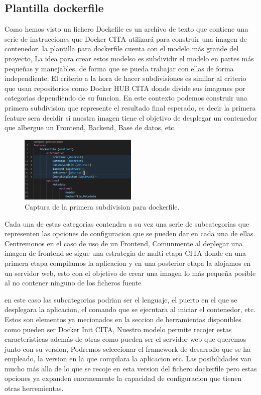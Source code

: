 \documentclass[12pt, a4paper, twoside]{article}
\begin{document}
\subsection{Plantilla dockerfile}
Como hemos visto un fichero Dockefile es un archivo de texto que contiene una serie de instrucciones que Docker CITA utilizará para construir una imagen de contenedor.
la plantilla para dockerfile cuenta con el modelo más grande del proyecto, La idea para crear estos modelso es subdividir el modelo en partes más pequeñas y manejables, de forma que se pueda trabajar con ellas de forma independiente.
El criterio a la hora de hacer subdivisiones es similar al criterio que usan repositorios como Docker HUB CITA donde divide sus imagenes por categorias dependiendo de su funcion.
En este contexto podemos construir una primera subdivision que represente el resultado final esperado, es decir la primera feature sera decidir si nuestra imagen 
tiene el objetivo de desplegar un contenedor que albergue un Frontend, Backend, Base de datos, etc.
\begin{figure}[ht]
	\centering
	  \includegraphics[width=0.5\textwidth]{dockerfile.uvl.png}
	\caption{Captura de la primera subdivision para dockerfile.}
\end{figure}

Cada una de estas categorias contendra a su vez una serie de subcategorias que representen las opciones de configuracion que se pueden dar en cada una de ellas.
Centremonos en el caso de uso de un Frontend, Comunmente al deplegar una imagen de frontend se sigue una estrategia de multi etapa CITA donde en una primera etapa compilamos la aplicacion 
y en una posterior etapa la alojamos en un servidor web, esto con el objetivo de crear una imagen lo más pequeña posible al no contener ninguno de los ficheros fuente

en este caso las subcategorias podrian ser el lenguaje, el puerto en el que se desplegara la aplicacion, el comando que se ejecutara al iniciar el contenedor, etc.
Estos son elementos ya mecionados en la seccion de herramientas disponibles como pueden ser Docker Init CITA, Nuestro modelo permite recojer estas caracteristicas además de otras 
como pueden ser el servidor web que queremos junto con su version, Podremos seleccionar el framework de desarrollo que se ha empleado, la version en la que compilara la aplicacion etc.
Las posibilidades van mucho más alla de lo que se recoje en esta version del fichero dockerfile pero estas opciones ya expanden enormemente la capacidad de configuracion que tienen otras 
herremientas. 
  
\end{document}
